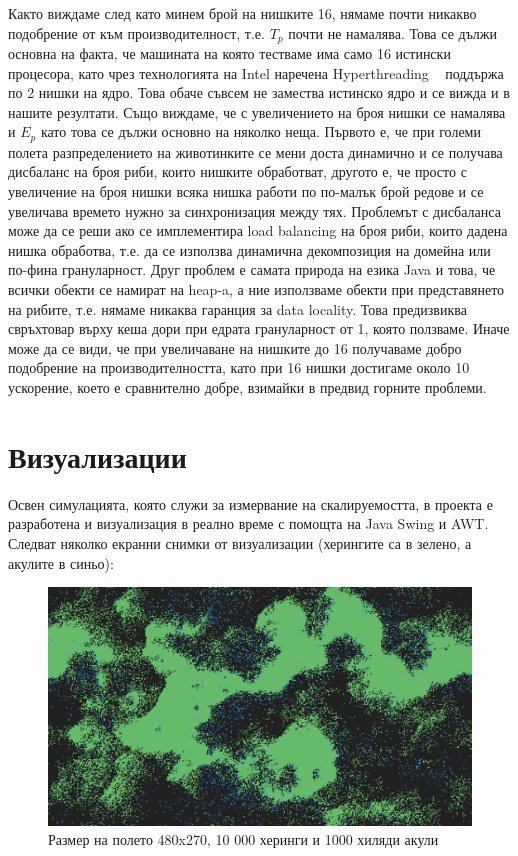 \documentclass[12pt]{article}
\begin{document}
\newpage

Както виждаме след като минем брой на нишките 16, нямаме почти никакво подобрение от към
производителност, т.е. $T_p$ почти не намалява. Това се дължи основна на факта, че машината
на която тестваме има само 16 истински процесора, като чрез технологията на Intel наречена Hyperthreading ~\cite{hyperthreading}
поддържа по 2 нишки на ядро. Това обаче съвсем не замества истинско ядро и се вижда и в нашите резултати.
\bigbreak
Също виждаме, че с увеличението на броя нишки се намалява и $E_p$ като това се дължи основно
на няколко неща. Първото е, че при големи полета разпределението на животинките се мени доста динамично
и се получава дисбаланс на броя риби, които нишките обработват, другото е, че просто с увеличение
на броя нишки всяка нишка работи по по-малък брой редове и се увеличава времето нужно за синхронизация
между тях. Проблемът с дисбаланса може да се реши ако се имплементира load balancing на броя
риби, които дадена нишка обработва, т.е. да се използва динамична декомпозиция на домейна
или по-фина грануларност.
\bigbreak
Друг проблем е самата природа на езика Java и това, че всички обекти се намират на heap-a,
а ние използваме обекти при представянето на рибите, т.е. нямаме никаква гаранция за
data locality. Това предизвиква свръхтовар върху кеша дори при едрата грануларност от 1, която ползваме.
\bigbreak
Иначе може да се види, че при увеличаване на нишките до 16 получаваме добро подобрение на
производителността, като при 16 нишки достигаме около 10 ускорение, което е сравнително добре,
взимайки в предвид горните проблеми.

\newpage

\section{Визуализации}
Освен симулацията, която служи за измервание на скалируемостта,
в проекта е разработена и визуализация в реално време с помощта на Java Swing и AWT.
Следват няколко екранни снимки от визуализации (херингите са в зелено, а акулите в синьо):

\begin{figure}[H]
	\centering
	\includegraphics[width=1\textwidth]{screenshot-small.png}
	\caption{Размер на полето 480x270, 10 000 херинги и 1000 хиляди акули}
\end{figure}
\end{document}
